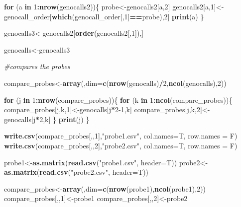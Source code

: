 \documentclass[
]{article}
\newenvironment{Shaded}{\begin{snugshade}}{\end{snugshade}}
\newcommand{\CommentTok}[1]{\textcolor[rgb]{0.56,0.35,0.01}{\textit{#1}}}
\newcommand{\ControlFlowTok}[1]{\textcolor[rgb]{0.13,0.29,0.53}{\textbf{#1}}}
\newcommand{\DataTypeTok}[1]{\textcolor[rgb]{0.13,0.29,0.53}{#1}}
\newcommand{\DecValTok}[1]{\textcolor[rgb]{0.00,0.00,0.81}{#1}}
\newcommand{\KeywordTok}[1]{\textcolor[rgb]{0.13,0.29,0.53}{\textbf{#1}}}
\newcommand{\NormalTok}[1]{#1}
\newcommand{\OperatorTok}[1]{\textcolor[rgb]{0.81,0.36,0.00}{\textbf{#1}}}
\newcommand{\StringTok}[1]{\textcolor[rgb]{0.31,0.60,0.02}{#1}}
\begin{document}
\begin{Shaded}
\begin{Highlighting}[]
\ControlFlowTok{for}\NormalTok{ (a }\ControlFlowTok{in} \DecValTok{1}\OperatorTok{:}\KeywordTok{nrow}\NormalTok{(genocalls2))\{}
\NormalTok{  probe<-genocalls2[a,}\DecValTok{2}\NormalTok{]}
\NormalTok{  genocalls2[a,}\DecValTok{1}\NormalTok{]<-genocall_order[}\KeywordTok{which}\NormalTok{(genocall_order[,}\DecValTok{1}\NormalTok{]}\OperatorTok{==}\NormalTok{probe),}\DecValTok{2}\NormalTok{]}
  \KeywordTok{print}\NormalTok{(a)}
\NormalTok{\}}

\NormalTok{genocalls3<-genocalls2[}\KeywordTok{order}\NormalTok{(genocalls2[,}\DecValTok{1}\NormalTok{]),]}

\NormalTok{genocalls<-genocalls3}


\CommentTok{#compares the probes}

\NormalTok{compare_probes<-}\KeywordTok{array}\NormalTok{(,}\DataTypeTok{dim=}\KeywordTok{c}\NormalTok{(}\KeywordTok{nrow}\NormalTok{(genocalls)}\OperatorTok{/}\DecValTok{2}\NormalTok{,}\KeywordTok{ncol}\NormalTok{(genocalls),}\DecValTok{2}\NormalTok{))}

\ControlFlowTok{for}\NormalTok{ (j }\ControlFlowTok{in} \DecValTok{1}\OperatorTok{:}\KeywordTok{nrow}\NormalTok{(compare_probes))\{}
  \ControlFlowTok{for}\NormalTok{ (k }\ControlFlowTok{in} \DecValTok{1}\OperatorTok{:}\KeywordTok{ncol}\NormalTok{(compare_probes))\{}
\NormalTok{    compare_probes[j,k,}\DecValTok{1}\NormalTok{]<-genocalls[j}\OperatorTok{*}\DecValTok{2-1}\NormalTok{,k]}
\NormalTok{    compare_probes[j,k,}\DecValTok{2}\NormalTok{]<-genocalls[j}\OperatorTok{*}\DecValTok{2}\NormalTok{,k]}
\NormalTok{    \} }
  \KeywordTok{print}\NormalTok{(j)}
\NormalTok{\}}

\KeywordTok{write.csv}\NormalTok{(compare_probes[,,}\DecValTok{1}\NormalTok{],}\StringTok{"probe1.csv"}\NormalTok{, }\DataTypeTok{col.names=}\NormalTok{T, }\DataTypeTok{row.names =}\NormalTok{ F)}
\KeywordTok{write.csv}\NormalTok{(compare_probes[,,}\DecValTok{2}\NormalTok{],}\StringTok{"probe2.csv"}\NormalTok{, }\DataTypeTok{col.names=}\NormalTok{T, }\DataTypeTok{row.names =}\NormalTok{ F)}


\NormalTok{probe1<-}\KeywordTok{as.matrix}\NormalTok{(}\KeywordTok{read.csv}\NormalTok{(}\StringTok{"probe1.csv"}\NormalTok{, }\DataTypeTok{header=}\NormalTok{T))}
\NormalTok{probe2<-}\KeywordTok{as.matrix}\NormalTok{(}\KeywordTok{read.csv}\NormalTok{(}\StringTok{"probe2.csv"}\NormalTok{, }\DataTypeTok{header=}\NormalTok{T))}

\NormalTok{compare_probes<-}\KeywordTok{array}\NormalTok{(,}\DataTypeTok{dim=}\KeywordTok{c}\NormalTok{(}\KeywordTok{nrow}\NormalTok{(probe1),}\KeywordTok{ncol}\NormalTok{(probe1),}\DecValTok{2}\NormalTok{))}
\NormalTok{compare_probes[,,}\DecValTok{1}\NormalTok{]<-probe1}
\NormalTok{compare_probes[,,}\DecValTok{2}\NormalTok{]<-probe2}


\end{Highlighting}
\end{Shaded}
\end{document}
